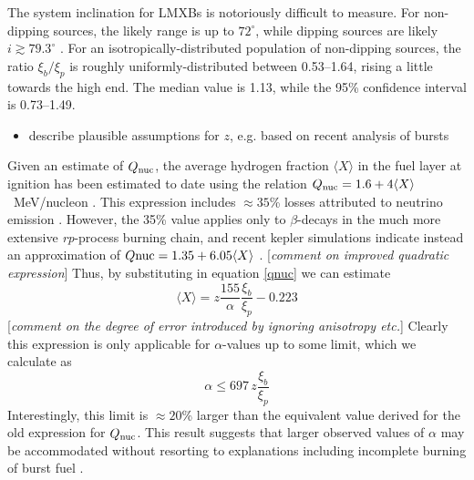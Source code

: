 \documentclass{aastex63}
\begin{document}
The system inclination for LMXBs is notoriously difficult to measure. For non-dipping sources, the likely range is up to $72^\circ$, while dipping sources are likely $i\gtrsim79.3^\circ$ \cite[]{gal16a}.
% 
For an isotropically-distributed population of non-dipping sources, the ratio $\xi_b/\xi_p$ is roughly uniformly-distributed between 0.53--1.64, rising a little towards the high end. The median value is 1.13, while the 95\% confidence interval is 0.73--1.49.

\begin{itemize}
\item describe plausible assumptions for $z$, e.g. based on recent analysis of bursts
\end{itemize}

Given an estimate of $Q_{\rm nuc}$, the average hydrogen fraction $\langle X\rangle$ in the fuel layer at ignition has been estimated to date using the relation $Q_{\rm nuc}=1.6 + 4\langle X\rangle$~MeV/nucleon \cite[e.g.][and references therein]{gal03d}. This expression includes $\approx35$\% losses
attributed to neutrino emission \cite[]{fuji87}. However, the 35\% value applies only to $\beta$-decays in the much more extensive {\it rp}-process burning chain, and recent {\sc kepler} simulations indicate instead an approximation of 
$Q{\rm nuc}=1.35+6.05\langle X\rangle$ 
\cite[]{goodwin19a}.
[{\it comment on improved quadratic expression}]
%
Thus, by substituting in equation \ref{qnuc} we can estimate 
\begin{equation}
\langle X\rangle 
 = z\frac{155}{\alpha}\frac{\xi_b}{\xi_p} - 0.223 \label{xbar}
\end{equation}
[{\it comment on the degree of error introduced by ignoring anisotropy etc.}] 
%
Clearly this expression is only applicable for $\alpha$-values up to some limit, which we calculate as
\begin{equation}
\alpha \leq 697\, z \frac{\xi_b}{\xi_p}
\end{equation}
Interestingly, this limit is 
$\approx20$\%
%
larger than the equivalent value derived for the old expression for $Q_{\rm nuc}$. This result suggests that larger observed values of $\alpha$ may be accommodated without resorting to explanations including incomplete burning of burst fuel \cite[e.g.][]{bcatalog}.
\end{document}
